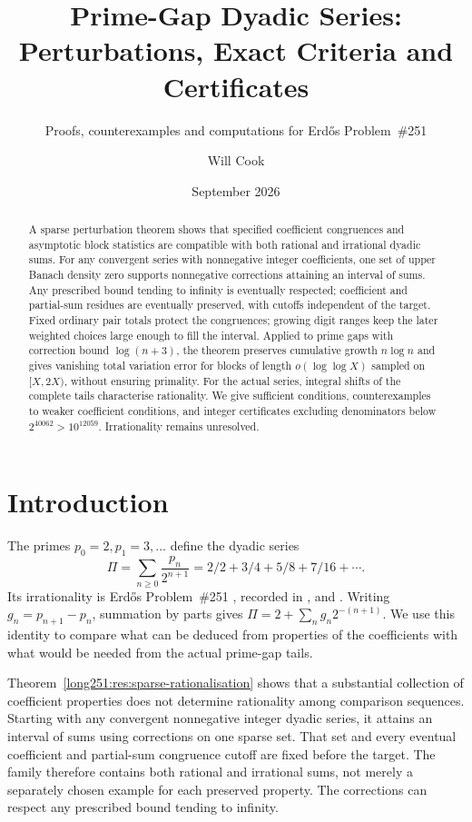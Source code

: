 \documentclass[11pt]{article}
\title{Prime-Gap Dyadic Series:\\Perturbations, Exact Criteria and Certificates}
\subtitle{Proofs, counterexamples and computations for Erd\H{o}s Problem~\#251}
\author{Will Cook}
\date{September 2026}
\begin{document}
\maketitle
\noteprovenance

\begin{abstract}
A sparse perturbation theorem shows that specified coefficient congruences
and asymptotic block statistics are compatible with both rational and irrational
dyadic sums.  For any convergent series with nonnegative integer
coefficients, one set of upper Banach density zero supports nonnegative
corrections attaining an interval of sums.  Any prescribed bound tending
to infinity is eventually respected; coefficient and partial-sum residues
are eventually preserved, with cutoffs independent of the target.
Fixed ordinary pair totals protect the congruences; growing digit ranges
keep the later weighted choices large enough to fill the interval.
Applied to prime gaps with correction bound $\log(n+3)$, the theorem
preserves cumulative growth $n\log n$ and gives vanishing total variation
error for blocks of length $o(\log\log X)$ sampled on $[X,2X)$, without
ensuring primality.
For the actual series, integral shifts of the complete tails characterise
rationality.  We give sufficient conditions, counterexamples to weaker
coefficient conditions, and integer certificates excluding denominators
below $2^{40062}>10^{12059}$.  Irrationality remains unresolved.
\end{abstract}

\section{Introduction}\label{long251:sec:problem}
The primes $p_0=2,p_1=3,\ldots$ define the dyadic series
\[
 \Pi=\sum_{n\ge0}\frac{p_n}{2^{n+1}}
     =2/2+3/4+5/8+7/16+\cdots.
\]
Its irrationality is Erd\H{o}s Problem~\#251 \cite{erdosproblems},
recorded in \cite[p.~94]{erdos1958}, \cite[p.~62]{erdosgraham1980} and
\cite[p.~103]{erdos1988}.  Writing $g_n=p_{n+1}-p_n$, summation by
parts gives $\Pi=2+\sum_ng_n2^{-(n+1)}$.  We use this identity to
compare what can be deduced from properties of the coefficients with
what would be needed from the actual prime-gap tails.

Theorem~\ref{long251:res:sparse-rationalisation} shows that a substantial
collection of coefficient properties does not determine rationality among
comparison sequences.  Starting with any convergent nonnegative integer
dyadic series, it attains an interval of sums using corrections on one
sparse set.  That set and every eventual coefficient and partial-sum
congruence cutoff are fixed before the target.  The family therefore
contains both rational and irrational sums, not merely a separately
chosen example for each preserved property.  The corrections can
respect any prescribed bound tending to infinity.
\end{document}
